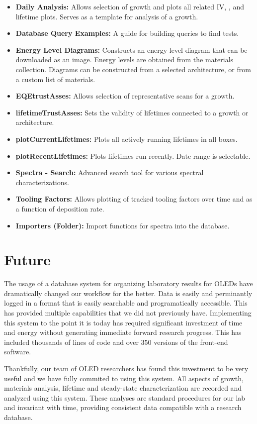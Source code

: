 \documentclass[../thesis.tex]{subfiles}
\begin{document}
\begin{itemize}
\item \textbf{Daily Analysis:} Allows selection of growth and plots all related IV, \eqe, and lifetime plots.  Serves as a template for analysis of a growth.
\item \textbf{Database Query Examples:} A guide for building queries to find tests.
\item \textbf{Energy Level Diagrams:} Constructs an energy level diagram that can be downloaded as an image.  Energy levels are obtained from the materials collection.  Diagrams can be constructed from a selected architecture, or from a custom list of materials.
\item \textbf{EQEtrustAsses:} Allows selection of representative \eqe scans for a growth.
\item \textbf{lifetimeTrustAsses:} Sets the validity of lifetimes connected to a growth or architecture.
\item \textbf{plotCurrentLifetimes:} Plots all actively running lifetimes in all boxes.
\item \textbf{plotRecentLifetimes:} Plots lifetimes run recently.  Date range is selectable.
\item \textbf{Spectra - Search:} Advanced search tool for various spectral characterizations.
\item \textbf{Tooling Factors:} Allows plotting of tracked tooling factors over time and as a function of deposition rate.
\item \textbf{Importers (Folder):} Import functions for spectra into the database.


\end{itemize}

\section{Future}

The usage of a database system for organizing laboratory results for OLEDs have dramatically changed our workflow for the better.
Data is easily and perminantly logged in a format that is easily searchable and programatically accessible.
This has provided multiple capabilities that we did not previously have.
Implementing this system to the point it is today has required significant investment of time and energy without generating immediate forward research progress.
This has included thousands of lines of code and over 350 versions of the front-end software.

Thankfully, our team of OLED researchers has found this investment to be very useful and we have fully commited to using this system.
All aspects of growth, materials analysis, lifetime and steady-state characterization are recorded and analyzed using this system.
These analyses are standard procedures for our lab and invariant with time, providing consistent data compatible with a research database.
\end{document}
